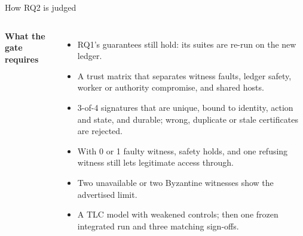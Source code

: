 \documentclass[aspectratio=169,10pt]{beamer}
\begin{document}
\begin{frame}{How RQ2 is judged}
\begin{columns}[T,onlytextwidth]
\footnotesize\textbf{What the gate requires}
\begin{itemize}\scriptsize\setlength{\itemsep}{2pt}
  \item RQ1's guarantees still hold: its suites are re-run on the new ledger.
  \item A trust matrix that separates witness faults, ledger safety, worker or authority compromise, and shared hosts.
  \item 3-of-4 signatures that are unique, bound to identity, action and state, and durable; wrong, duplicate or stale certificates are rejected.
  \item With 0 or 1 faulty witness, safety holds, and one refusing witness still lets legitimate access through.
  \item Two unavailable or two Byzantine witnesses show the advertised limit.
  \item A TLC model with weakened controls; then one frozen integrated run and three matching sign-offs.
\end{itemize}
\end{columns}

\vspace{0.4em}
\end{frame}
\end{document}
